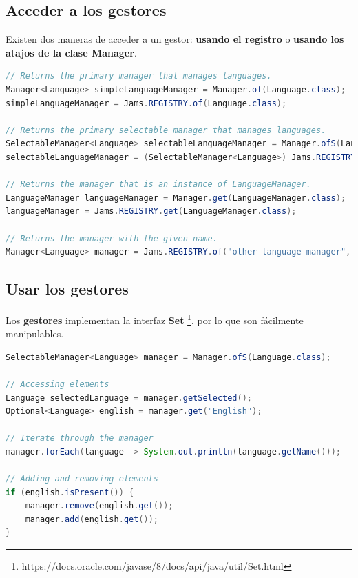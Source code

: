 \subsection{Acceder a los gestores}\label{subsec:acceder-a-los-gestores}

Existen dos maneras de acceder a un gestor: \textbf{usando el registro} o
\textbf{usando los atajos de la clase Manager}.

\begin{lstlisting}[language=Java,style=java,frame=single,label={lst:acceder-a-los-gestores}]
// Returns the primary manager that manages languages.
Manager<Language> simpleLanguageManager = Manager.of(Language.class);
simpleLanguageManager = Jams.REGISTRY.of(Language.class);

// Returns the primary selectable manager that manages languages.
SelectableManager<Language> selectableLanguageManager = Manager.ofS(Language.class);
selectableLanguageManager = (SelectableManager<Language>) Jams.REGISTRY.of(Language.class);

// Returns the manager that is an instance of LanguageManager.
LanguageManager languageManager = Manager.get(LanguageManager.class);
languageManager = Jams.REGISTRY.get(LanguageManager.class);

// Returns the manager with the given name.
Manager<Language> manager = Jams.REGISTRY.of("other-language-manager", Language.class);
\end{lstlisting}

\subsection{Usar los gestores}\label{subsec:usar-los-gestores}

Los \textbf{gestores} implementan la interfaz \textbf{Set}
\footnote{https://docs.oracle.com/javase/8/docs/api/java/util/Set.html},
por lo que son fácilmente manipulables.

\begin{lstlisting}[language=Java,style=java,frame=single,label={lst:usar-los-gestores}]
SelectableManager<Language> manager = Manager.ofS(Language.class);

// Accessing elements
Language selectedLanguage = manager.getSelected();
Optional<Language> english = manager.get("English");

// Iterate through the manager
manager.forEach(language -> System.out.println(language.getName()));

// Adding and removing elements
if (english.isPresent()) {
    manager.remove(english.get());
    manager.add(english.get());
}
\end{lstlisting}

